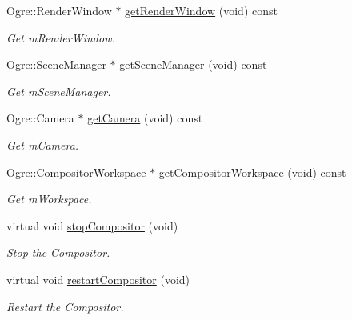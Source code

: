 \begin{DoxyCompactItemize}
Ogre\+::\+Render\+Window $\ast$ \hyperlink{class_common_1_1_graphics_system_a7b330688e6c66c74e23ec57eab54f341}{get\+Render\+Window} (void) const
\begin{DoxyCompactList}\small\item\em Get m\+Render\+Window. \end{DoxyCompactList}\item 
\mbox{\label{class_common_1_1_graphics_system_aef392cd73eb9571778a0910e9b991cac}} 
Ogre\+::\+Scene\+Manager $\ast$ \hyperlink{class_common_1_1_graphics_system_aef392cd73eb9571778a0910e9b991cac}{get\+Scene\+Manager} (void) const
\begin{DoxyCompactList}\small\item\em Get m\+Scene\+Manager. \end{DoxyCompactList}\item 
\mbox{\label{class_common_1_1_graphics_system_a7497c78b142d7dd1461418a75804bc58}} 
Ogre\+::\+Camera $\ast$ \hyperlink{class_common_1_1_graphics_system_a7497c78b142d7dd1461418a75804bc58}{get\+Camera} (void) const
\begin{DoxyCompactList}\small\item\em Get m\+Camera. \end{DoxyCompactList}\item 
\mbox{\label{class_common_1_1_graphics_system_a24280225a9fd08efd4ac9100c7de07c0}} 
Ogre\+::\+Compositor\+Workspace $\ast$ \hyperlink{class_common_1_1_graphics_system_a24280225a9fd08efd4ac9100c7de07c0}{get\+Compositor\+Workspace} (void) const
\begin{DoxyCompactList}\small\item\em Get m\+Workspace. \end{DoxyCompactList}\item 
\mbox{\label{class_common_1_1_graphics_system_aab69bdc895c97c506caab1fa828b575a}} 
virtual void \hyperlink{class_common_1_1_graphics_system_aab69bdc895c97c506caab1fa828b575a}{stop\+Compositor} (void)
\begin{DoxyCompactList}\small\item\em Stop the Compositor. \end{DoxyCompactList}\item 
\mbox{\label{class_common_1_1_graphics_system_aa7a5a6ce9e1da97940f5af5785bb4a8a}} 
virtual void \hyperlink{class_common_1_1_graphics_system_aa7a5a6ce9e1da97940f5af5785bb4a8a}{restart\+Compositor} (void)
\begin{DoxyCompactList}\small\item\em Restart the Compositor. \end{DoxyCompactList}\end{DoxyCompactItemize}
